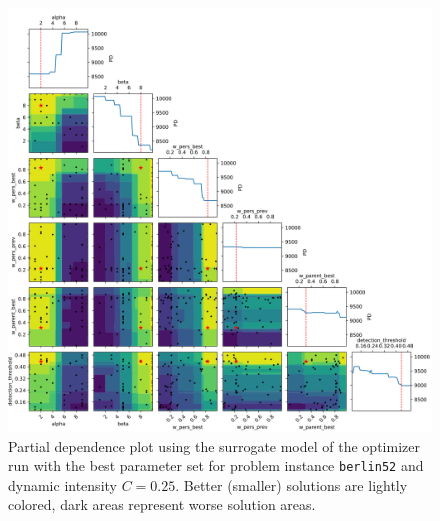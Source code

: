 \begin{figure}[h]
	\centering
	\centerline{\includegraphics[width=1.2\textwidth]{results/part2/partial_dependence_berlin52_C_0.25_run_4.svg}}
	\caption[Partial dependence plot for \texttt{berlin52} and $C=0.25$]{Partial dependence plot using the surrogate model of the optimizer run with the best parameter set for problem instance \texttt{berlin52} and dynamic intensity $C=0.25$. Better (smaller) solutions are lightly colored, dark areas represent worse solution areas.}
	\label{fig:partial_dependence_berlin52_C_025}
\end{figure}

